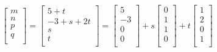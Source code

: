\begin{Answer}
\begin{equation*}
\begin{bmatrix}
m\\
n\\
p\\
q\\
\end{bmatrix}
=
\begin{bmatrix}
5+t\\
-3+s+2t\\
s\\
t\\    
\end{bmatrix}
=
\begin{bmatrix}
5\\
-3\\
0\\
0\\
\end{bmatrix}
+s
\begin{bmatrix}
0\\
1\\
1\\
0\\
\end{bmatrix}
+t
\begin{bmatrix}
1\\
2\\
0\\
1\\
\end{bmatrix}
\end{equation*}
\end{Answer}

